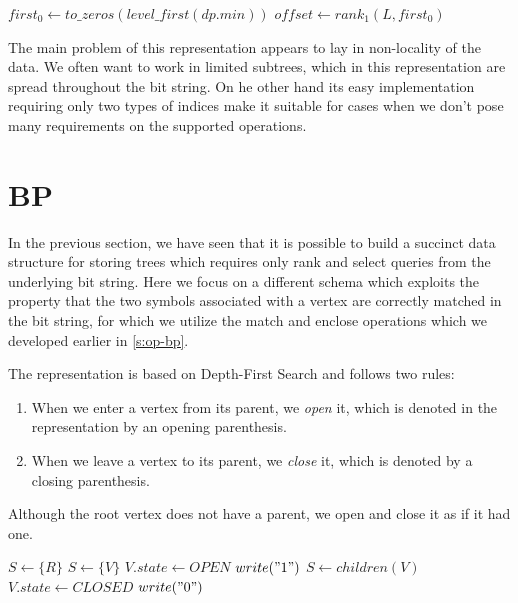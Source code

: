 \begin{algorithmic}
		\State {}
	\Else
		\State $first_0 \gets to\_zeros(level\_first(dp.min))$
		\State $offset \gets rank_1(L, first_0)$
		\State {}
	\EndIf
\EndFunction
\end{algorithmic}

\bigskip

The main problem of this representation appears to lay in non-locality of the data.
We often want to work in limited subtrees, which in this representation are spread throughout the bit string.
On he other hand its easy implementation requiring only two types of indices make it suitable for cases when we don't pose many requirements on the supported operations.

\section{BP}

In the previous section, we have seen that it is possible to build a succinct data structure for storing trees which requires only rank and select queries from the underlying bit string.
Here we focus on a different schema which exploits the property that the two symbols associated with a vertex are correctly matched in the bit string, for which we utilize the match and enclose operations which we developed earlier in \ref{s:op-bp}.

The representation is based on Depth-First Search and follows two rules:
\begin{enumerate}
	\item When we enter a vertex from its parent, we \emph{open} it, which is denoted in the representation by an opening parenthesis.
	\item When we leave a vertex to its parent, we \emph{close} it, which is denoted by a closing parenthesis.
\end{enumerate}
Although the root vertex does not have a parent, we open and close it as if it had one.

\begin{algorithmic}
	\State $S \gets \{R\}$ 
		 
			\State $ S \gets \{V\}$ 
			\State $V.state \gets OPEN$
			\State $write("1")$
			\State $ S \gets children(V)$
		 
			\State $V.state \gets CLOSED$
			\State $write("0")$
		\EndIf
	\EndWhile
\EndFunction
\end{algorithmic}

